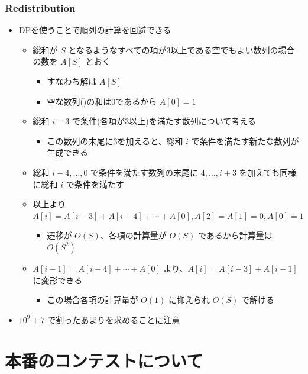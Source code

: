 \documentclass[t, aspectratio=169, dvipdfmx]{beamer}
\begin{document}
\begin{frame}
  \frametitle{Redistribution}
  \begin{itemize}
    \item DPを使うことで順列の計算を回避できる
    \begin{itemize}
      \item 総和が $S$ となるようなすべての項が3以上である\underline{空でもよい}数列の場合の数を $A[S]$ とおく
      \begin{itemize}
        \item すなわち解は $A[S]$
        \item 空な数列()の和は0であるから $A[0]=1$
      \end{itemize}
      \item 総和 $i-3$ で条件(各項が3以上)を満たす数列について考える
      \begin{itemize}
        \item この数列の末尾に3を加えると、総和 $i$ で条件を満たす新たな数列が生成できる
      \end{itemize}
      \item 総和 $i-4,\ldots,0$ で条件を満たす数列の末尾に $4,\ldots,i+3$ を加えても同様に総和 $i$ で条件を満たす
      \item 以上より $A[i]=A[i-3]+A[i-4]+\cdots+A[0],A[2]=A[1]=0,A[0]=1$
      \begin{itemize}
        \item 遷移が $O(S)$、各項の計算量が $O(S)$ であるから計算量は $O(S^2)$
      \end{itemize}
      \item $A[i-1]=A[i-4]+\cdots+A[0]$ より、$A[i]=A[i-3]+A[i-1]$ に変形できる
      \begin{itemize}
        \item この場合各項の計算量が $O(1)$ に抑えられ $O(S)$ で解ける
      \end{itemize}
    \end{itemize}
    \item $10^9+7$ で割ったあまりを求めることに注意
  \end{itemize}
\end{frame}

\section{本番のコンテストについて}
\frame{\sectionpage}
\end{document}
